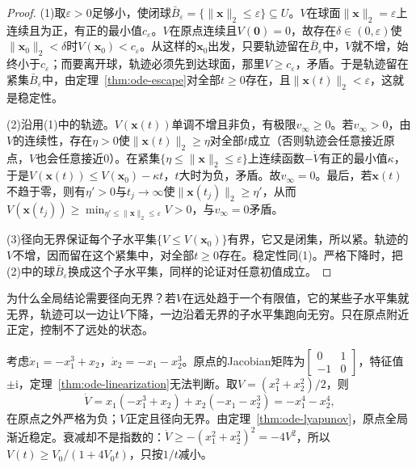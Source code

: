 \begin{proof}
  (1)取$\varepsilon>0$足够小，使闭球$\bar B_\varepsilon=\{\|\bm x\|_2\leq\varepsilon\}\subseteq U$。$V$在球面$\|\bm x\|_2=\varepsilon$上连续且为正，有正的最小值$c_\varepsilon$。$V$在原点连续且$V(\bm0)=0$，故存在$\delta\in(0,\varepsilon)$使$\|\bm x_0\|_2<\delta$时$V(\bm x_0)<c_\varepsilon$。从这样的$\bm x_0$出发，只要轨迹留在$\bar B_\varepsilon$中，$V$就不增，始终小于$c_\varepsilon$；而要离开球，轨迹必须先到达球面，那里$V\geq c_\varepsilon$，矛盾。于是轨迹留在紧集$\bar B_\varepsilon$中，由定理~\ref{thm:ode-escape}对全部$t\geq0$存在，且$\|\bm x(t)\|_2<\varepsilon$，这就是稳定性。

  (2)沿用(1)中的轨迹。$V(\bm x(t))$单调不增且非负，有极限$v_\infty\geq0$。若$v_\infty>0$，由$V$的连续性，存在$\eta>0$使$\|\bm x(t)\|_2\geq\eta$对全部$t$成立（否则轨迹会任意接近原点，$V$也会任意接近$0$）。在紧集$\{\eta\leq\|\bm x\|_2\leq\varepsilon\}$上连续函数$-\dot V$有正的最小值$\kappa$，于是$V(\bm x(t))\leq V(\bm x_0)-\kappa t$，$t$大时为负，矛盾。故$v_\infty=0$。最后，若$\bm x(t)$不趋于零，则有$\eta'>0$与$t_j\to\infty$使$\|\bm x(t_j)\|_2\geq\eta'$，从而$V(\bm x(t_j))\geq\min_{\eta'\leq\|\bm x\|_2\leq\varepsilon}V>0$，与$v_\infty=0$矛盾。

  (3)径向无界保证每个子水平集$\{V\leq V(\bm x_0)\}$有界，它又是闭集，所以紧。轨迹的$V$不增，因而留在这个紧集中，对全部$t\geq0$存在。稳定性同(1)。严格下降时，把(2)中的球$\bar B_\varepsilon$换成这个子水平集，同样的论证对任意初值成立。
\end{proof}

为什么全局结论需要径向无界？若$V$在远处趋于一个有限值，它的某些子水平集就无界，轨迹可以一边让$V$下降，一边沿着无界的子水平集跑向无穷。只在原点附近正定，控制不了远处的状态。

\begin{example}[线性化失效而Lyapunov函数有效]
  \label{ex:ode-lyapunov-cubic}
  考虑$\dot x_1=-x_1^3+x_2$，$\dot x_2=-x_1-x_2^3$。原点的Jacobian矩阵为$\begin{bmatrix}0&1\\-1&0\end{bmatrix}$，特征值$\pm\mathrm i$，定理~\ref{thm:ode-linearization}无法判断。取$V=(x_1^2+x_2^2)/2$，则
  \[
    \dot V=x_1(-x_1^3+x_2)+x_2(-x_1-x_2^3)=-x_1^4-x_2^4,
  \]
  在原点之外严格为负；$V$正定且径向无界。由定理~\ref{thm:ode-lyapunov}，原点全局渐近稳定。衰减却不是指数的：$\dot V\geq-(x_1^2+x_2^2)^2=-4V^2$，所以$V(t)\geq V_0/(1+4V_0t)$，只按$1/t$减小。
\end{example}

